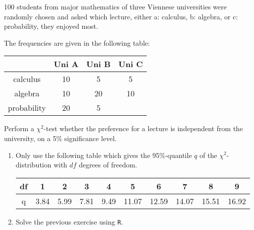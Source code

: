 
\begin{exercise}

100 students from major mathematics of three Viennese universities
were randomly chosen and asked which lecture, either a: calculus,
b: algebra, or c: probability, they enjoyed most.

The frequencies are given in the following table:

\begin{center}
    \begin{tabular}{c|c|c|c}
        & Uni A & Uni B & Uni C \\
        \hline
        calculus & 10 & 5 & 5 \\
        \hline
        algebra & 10 & 20 & 10 \\
        \hline
        probability & 20 & 5 & 
    \end{tabular}
\end{center}

Perform a $\chi^2$-test whether the preference for a lecture is independent
from the university, on a 5\% significance level.

\begin{enumerate}[label = (\alph*)]
    \item Only use the following table which gives the 95\%-quantile $q$
    of the $\chi^2$-distribution with $df$ degrees of freedom.

    \begin{center}
        \begin{tabular}{c||c|c|c|c|c|c|c|c|c}
            df & 1 & 2 & 3 & 4 & 5 & 6 & 7 & 8 & 9 \\
            \hline
            q & 3.84 & 5.99 & 7.81 & 9.49 & 11.07 & 12.59 & 14.07 & 15.51 & 16.92
        \end{tabular}
    \end{center}

    \item Solve the previous exercise using \texttt{R}.
\end{enumerate}

\end{exercise}


\begin{solution}

\phantom{}

\end{solution}

